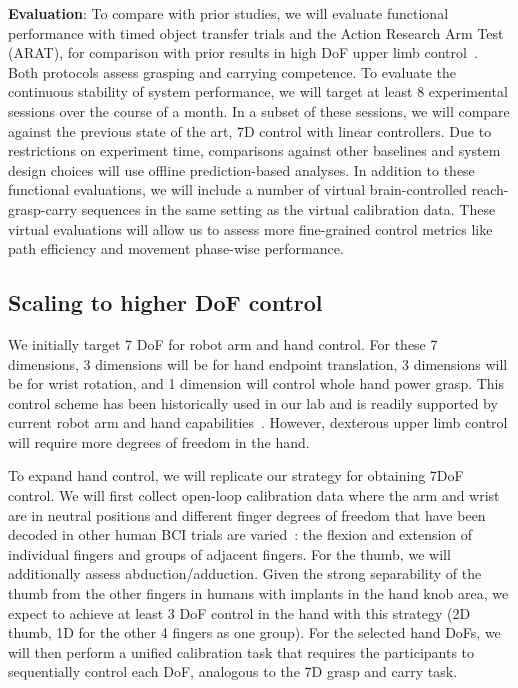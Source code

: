 \documentclass[12pt,oneside]{report}
\begin{document}
\textbf{Evaluation}: To compare with prior studies, we will evaluate functional performance with timed object transfer trials and the Action Research Arm Test (ARAT), for comparison with prior results in high DoF upper limb control~\citep{collinger2013high,wodlinger_15_10d}. Both protocols assess grasping and carrying competence. To evaluate the continuous stability of system performance, we will target at least 8 experimental sessions over the course of a month. In a subset of these sessions, we will compare against the previous state of the art, 7D control with linear controllers. Due to restrictions on experiment time, comparisons against other baselines and system design choices will use offline prediction-based analyses. In addition to these functional evaluations, we will include a number of virtual brain-controlled reach-grasp-carry sequences in the same setting as the virtual calibration data. These virtual evaluations will allow us to assess more fine-grained control metrics like path efficiency and movement phase-wise performance.

\subsection{Scaling to higher DoF control}
We initially target 7 DoF for robot arm and hand control. For these 7 dimensions, 3 dimensions will be for hand endpoint translation, 3 dimensions will be for wrist rotation, and 1 dimension will control whole hand power grasp. This control scheme has been historically used in our lab and is readily supported by current robot arm and hand capabilities~\citep{collinger2013high}. However, dexterous upper limb control will require more degrees of freedom in the hand.

To expand hand control, we will replicate our strategy for obtaining
7DoF control. We will first collect open-loop calibration data where the arm and wrist are in neutral positions and different finger degrees of freedom that have been decoded in other human BCI trials are varied~\citep{shah2025pseudo,willsey2024real}: the flexion and extension of individual fingers and groups of adjacent fingers. For the thumb, we will additionally assess abduction/adduction. Given the strong separability of the thumb from the other fingers in humans with implants in the hand knob area, we expect to achieve at least 3 DoF control in the hand with this strategy (2D thumb, 1D for the other 4 fingers as one group). For the selected hand DoFs, we will then perform a unified calibration task that requires the participants to sequentially control each DoF, analogous to the 7D grasp and carry task.
\end{document}
